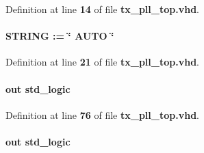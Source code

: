 Definition at line {\bf 14} of file {\bf tx\+\_\+pll\+\_\+top.\+vhd}.

\paragraph[{bandwidth\+\_\+type}]{ {\bfseries \textcolor{vhdlchar}{ }} {\bfseries \textcolor{comment}{S\+T\+R\+I\+NG}\textcolor{vhdlchar}{ }\textcolor{vhdlchar}{ }\textcolor{vhdlchar}{\+:}\textcolor{vhdlchar}{=}\textcolor{vhdlchar}{ }\textcolor{vhdlchar}{ }\textcolor{vhdlchar}{ }\textcolor{vhdlchar}{ }\textcolor{keyword}{\char`\"{} A\+U\+T\+O \char`\"{}}\textcolor{vhdlchar}{ }} \hspace{0.3cm}{\ttfamily [Generic]}}\label{classtx__pll__top_a1eb0b5954e47c20c8b6abeb257908550}


Definition at line {\bf 21} of file {\bf tx\+\_\+pll\+\_\+top.\+vhd}.

\paragraph[{busy}]{ {\bfseries \textcolor{keywordflow}{out}\textcolor{vhdlchar}{ }} {\bfseries \textcolor{comment}{std\+\_\+logic}\textcolor{vhdlchar}{ }} \hspace{0.3cm}{\ttfamily [Port]}}\label{classtx__pll__top_aae338b3a18acd4650d65866291f3aece}


Definition at line {\bf 76} of file {\bf tx\+\_\+pll\+\_\+top.\+vhd}.

\paragraph[{c0}]{ {\bfseries \textcolor{keywordflow}{out}\textcolor{vhdlchar}{ }} {\bfseries \textcolor{comment}{std\+\_\+logic}\textcolor{vhdlchar}{ }} \hspace{0.3cm}{\ttfamily [Port]}}\label{classtx__pll__top_a51a13db7a16824f73cd8e8b973b0cced}


